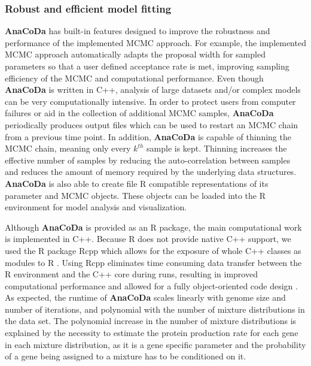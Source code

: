 \documentclass{bioinfo}
\newcommand{\package}{\textbf{AnaCoDa }} %
\begin{document}
\subsubsection*{Robust and efficient model fitting}
\package has built-in features designed to improve the robustness and performance of the implemented MCMC approach. 
For example, the implemented MCMC approach automatically adapts the proposal width for sampled parameters so that a user defined acceptance rate is met, improving sampling efficiency of the MCMC and computational performance.
Even though \package is written in C++, analysis of large datasets and/or complex models can be very computationally intensive.
In order to protect users from computer failures or aid in the collection of additional MCMC samples, \package periodically produces output files which can be used to restart an MCMC chain from a previous time point.
In addition, \package is capable of thinning the MCMC chain, meaning only every $k^{th}$ sample is kept. 
Thinning increases the effective number of samples by reducing the auto-correlation between samples and reduces the amount of memory required by the underlying data structures. 
\package is also able to create file R compatible representations of its parameter and MCMC objects.
These objects can be loaded into the R environment for model analysis and visualization.

Although \package is provided as an R package, the main computational work is implemented in C++.
Because R does not provide native C++ support, we used the R package Rcpp which allows for the exposure of whole C++ classes as modules to R \citep{rcpp_package}.
Using Rcpp eliminates time consuming data transfer between the R environment and the C++ core during runs, resulting in improved computational performance and allowed for a fully object-oriented code design \citep{ood_book}. 
As expected, the runtime of \package scales linearly with genome size and number of iterations, and polynomial with the number of mixture distributions in the data set. The polynomial increase in the number of mixture distributions is explained by the necessity to estimate the protein production rate for each gene in each mixture distribution, as it is a gene specific parameter and the probability of a gene being assigned to a mixture has to be conditioned on it.
\end{document}
